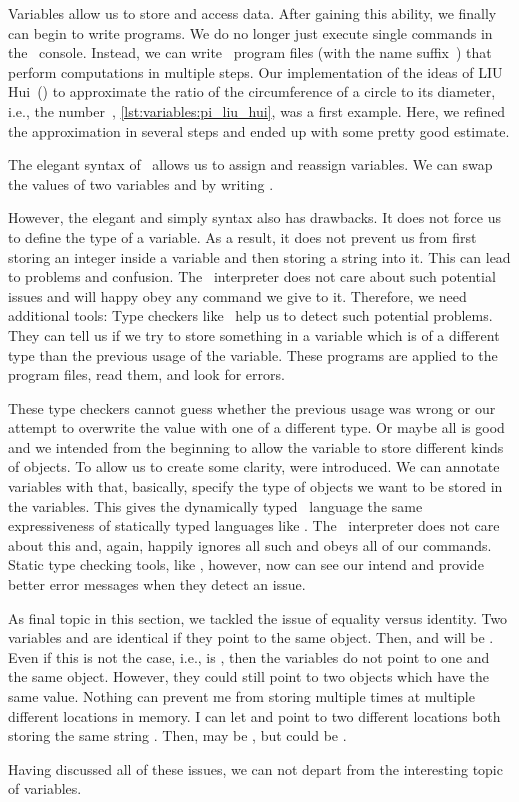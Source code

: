 %
%
Variables allow us to store and access data.
After gaining this ability, we finally can begin to write  programs.
We do no longer just execute single commands in the \python\ console.
Instead, we can write \python\ program files (with the name suffix~) that perform computations in multiple steps.
Our implementation of the ideas of LIU Hui~() to approximate the ratio of the circumference of a circle to its diameter, i.e., the number~\numberPi, \cref{lst:variables:pi_liu_hui}, was a first example.
Here, we refined the approximation in several steps and ended up with some pretty good estimate.

The elegant syntax of \python\ allows us to assign and reassign variables.
We can swap the values of two variables  and  by writing .

However, the elegant and simply syntax also has drawbacks.
It does not force us to define the type of a variable.
As a result, it does not prevent us from first storing an integer inside a variable and then storing a string into it.
This can lead to problems and confusion.
The \python\ interpreter does not care about such potential issues and will happy obey any command we give to it.
Therefore, we need additional tools:
Type checkers like \mypy\ help us to detect such potential problems.
They can tell us if we try to store something in a variable which is of a different type than the previous usage of the variable.
These programs are applied to the program files, read them, and look for errors.

These type checkers cannot guess whether the previous usage was wrong or our attempt to overwrite the value with one of a different type.
Or maybe all is good and we intended from the beginning to allow the variable to store different kinds of objects.
To allow us to create some clarity,  were introduced.
We can annotate variables with  that, basically, specify the type of objects we want to be stored in the variables.
This gives the dynamically typed \python\ language the same expressiveness of statically typed languages like .
The \python\ interpreter does not care about this and, again, happily ignores all such  and obeys all of our commands.
Static type checking tools, like \mypy, however, now can see our intend and provide better error messages when they detect an issue.

As final topic in this section, we tackled the issue of equality versus identity.
Two variables  and  are identical if they point to the same object.
Then,  and  will be .
Even if this is not the case, i.e.,  is , then the variables do not point to one and the same object.
However, they could still point to two objects which have the same value.
Nothing can prevent me from storing  multiple times at multiple different locations in memory.
I can let  and  point to two different locations both storing the same string .
Then,  may be , but  could be .

Having discussed all of these issues, we can not depart from the interesting topic of variables.%
%
\endhsection%
%
